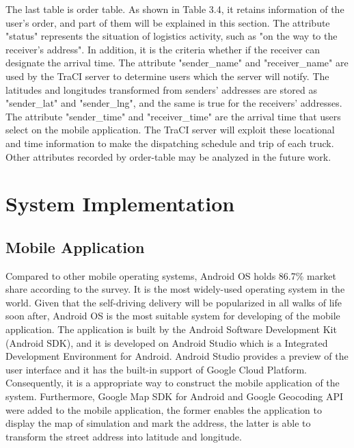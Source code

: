 \documentclass[12pt]{ksthesis}
\begin{document}
\begin{thesis}
{The last table is order table. As shown in Table 3.4, it retains information of the user’s order, and part of them will be explained in this section. The attribute "status" represents the situation of logistics activity, such as "on the way to the receiver’s address". In addition, it is the criteria whether if the receiver can designate the arrival time. The attribute "sender\_name" and "receiver\_name" are used by the TraCI server to determine users which the server will notify. The latitudes and longitudes transformed from senders’ addresses are stored as "sender\_lat" and "sender\_lng", and the same is true for the receivers’ addresses. The attribute "sender\_time" and "receiver\_time" are the arrival time that users select on the mobile application. The TraCI server will exploit these locational and time information to make the dispatching schedule and trip of each truck. Other attributes recorded by order-table may be analyzed in the future work. 
  



\chapter{System Implementation}\label{Chap:System_Implementation}

\section{Mobile Application}


Compared to other mobile operating systems, Android OS holds 86.7\% market share according to the survey. It is the most widely-used operating system in the world. Given that the self-driving delivery will be popularized in all walks of life soon after, Android OS is the most suitable system for developing of the mobile application. The application is built by the Android Software Development Kit (Android SDK), and it is developed on Android Studio which is a Integrated Development Environment for Android. Android Studio provides a preview of the user interface and it has the built-in support of Google Cloud Platform. Consequently, it is a appropriate way to construct the mobile application of the system. Furthermore, Google Map SDK for Android and Google Geocoding API were added to the mobile application, the former enables the application to display the map of simulation and mark the address, the latter is able to transform the street address into latitude and longitude.

}
\end{thesis}
\end{document}
